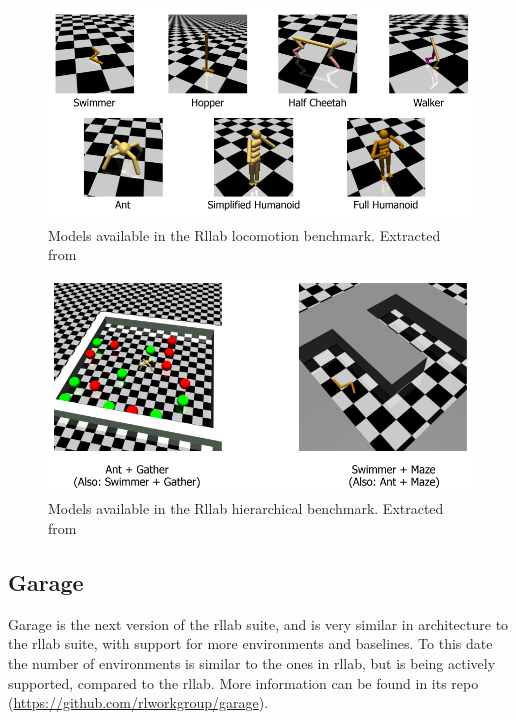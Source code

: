     \begin{figure}[!ht]
        \centering
        \includegraphics[width=4.5in]{./chapters/imgs/img_rllab_envs_locomotion.png}
        \caption[rllab locomotion models]{Models available in the Rllab locomotion benchmark. Extracted from \citet{Rllab}}
        \label{fig:rllab-envs-locomotion}
    \end{figure}

    \begin{figure}[!ht]
        \centering
        \includegraphics[width=5.0in]{./chapters/imgs/img_rllab_envs_hierarchical.png}
        \caption[rllab hierarchical models]{Models available in the Rllab hierarchical benchmark. Extracted from \citet{Rllab}}
        \label{fig:rllab-envs-hierarchical}
    \end{figure}

    \subsection{Garage}
    Garage is the next version of the rllab suite, and is very similar in architecture to the rllab suite, with support
    for more environments and baselines. To this date the number of environments is similar to the ones in rllab, but is
    being actively supported, compared to the rllab. More information can be found in its repo (\url{https://github.com/rlworkgroup/garage}).

